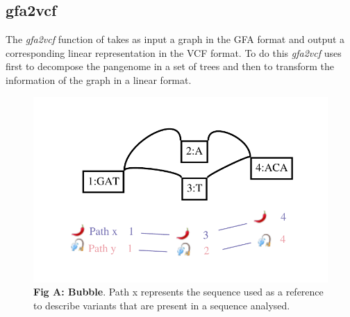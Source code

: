 
\setcounter{secnumdepth}{3}
\subsection{gfa2vcf}
The \textit{gfa2vcf} function of \vgp takes as input a graph in the GFA format and output a corresponding linear representation in the VCF format. To do this \textit{gfa2vcf} uses first \bbp to decompose the pangenome in a set of trees and then \bbc to transform the information of the graph in a linear format. 


\begin{figure}[H]
\centering
\includegraphics[width=1.10\textwidth]{fig/GraphchrXnew.pdf}
\decoRule
\caption{\textbf{Fig A: Bubble}. Path x represents the sequence used as a reference to describe variants that are present in a sequence analysed.} %
\label{fig:bubble.png}
\end{figure}




